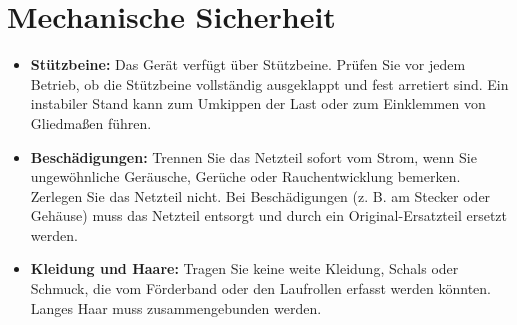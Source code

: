 \bigskip

\section{Mechanische Sicherheit}
\begin{itemize}
	\item \textbf {Stützbeine:}
	Das Gerät verfügt über Stützbeine. Prüfen Sie vor jedem Betrieb, ob die Stützbeine vollständig ausgeklappt und fest arretiert sind. Ein instabiler Stand kann zum Umkippen der Last oder zum Einklemmen von Gliedmaßen führen.
	\item \textbf {Beschädigungen:}
	Trennen Sie das Netzteil sofort vom Strom, wenn Sie ungewöhnliche Geräusche, Gerüche oder Rauchentwicklung bemerken. Zerlegen Sie das Netzteil nicht. Bei Beschädigungen (z. B. am Stecker oder Gehäuse) muss das Netzteil entsorgt und durch ein Original-Ersatzteil ersetzt werden.
	\item \textbf {Kleidung und Haare:}
	Tragen Sie keine weite Kleidung, Schals oder Schmuck, die vom Förderband oder den Laufrollen erfasst werden könnten. Langes Haar muss zusammengebunden werden.
\end{itemize}
%
%
%
%
%
